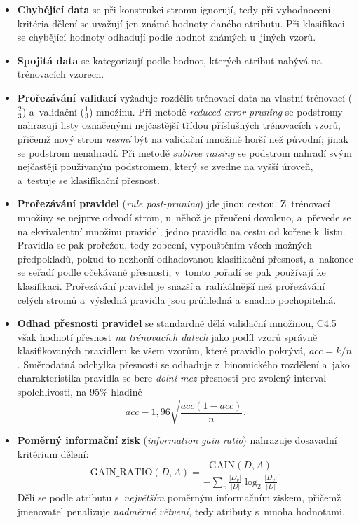 \documentclass[11pt,a4paper]{article}
\theoremstyle{definition}
\begin{document}
\begin{itemize}
\item \textbf{Chybějící data} se při konstrukci stromu ignorují, tedy při vyhodnocení kritéria
      dělení se uvažují jen známé hodnoty daného atributu. Při klasifikaci se chybějící
      hodnoty odhadují podle hodnot známých u~jiných vzorů.
\item \textbf{Spojitá data} se kategorizují podle hodnot, kterých atribut nabývá na
      trénovacích vzorech.
\item \textbf{Prořezávání validací} vyžaduje rozdělit trénovací data na vlastní trénovací
      ($\tfrac23$) a~validační ($\tfrac13$) množinu. Při metodě \emph{reduced-error pruning}
      se podstromy nahrazují listy označenými nejčastější třídou příslušných trénovacích
      vzorů, přičemž nový strom \emph{nesmí} být na validační množině horší než původní;
      jinak se podstrom nenahradí. Při metodě \emph{subtree raising} se podstrom nahradí svým
      nejčastěji používaným podstromem, který se zvedne na vyšší úroveň, a~testuje se
      klasifikační přesnost.
\item \textbf{Prořezávání pravidel} (\emph{rule post-pruning}) jde jinou cestou. Z~trénovací
      množiny se nejprve odvodí strom, u~něhož je přeučení dovoleno, a~převede se na
      ekvivalentní množinu pravidel, jedno pravidlo na cestu od kořene k~listu. Pravidla se
      pak prořežou, tedy zobecní, vypouštěním všech možných předpokladů, pokud to nezhorší
      odhadovanou klasifikační přesnost, a~nakonec se seřadí podle očekávané přesnosti;
      v~tomto pořadí se pak používají ke klasifikaci. Prořezávání pravidel je snazší
      a~radikálnější než prořezávání celých stromů a~výsledná pravidla jsou průhledná
      a~snadno pochopitelná.
\item \textbf{Odhad přesnosti pravidel} se standardně dělá validační množinou, C4.5 však
      hodnotí přesnost \emph{na trénovacích datech} jako podíl vzorů správně klasifikovaných
      pravidlem ke všem vzorům, které pravidlo pokrývá, $\mathit{acc}=k/n$. Směrodatná
      odchylka přesnosti se odhaduje z~binomického rozdělení a~jako charakteristika pravidla
      se bere \emph{dolní mez} přesnosti pro zvolený interval spolehlivosti, na 95\% hladině
      \[ \mathit{acc}-1{,}96\sqrt{\frac{\mathit{acc}(1-\mathit{acc})}{n}}. \]
\item \textbf{Poměrný informační zisk} (\emph{information gain ratio}) nahrazuje dosavadní
      kritérium dělení:
      \[ \mathrm{GAIN\_RATIO}(D,A)=\frac{\mathrm{GAIN}(D,A)}
         {-\sum_{v}\frac{|D_v|}{|D|}\log_2\frac{|D_v|}{|D|}}. \]
      Dělí se podle atributu s~\emph{největším} poměrným informačním ziskem, přičemž
      jmenovatel penalizuje \emph{nadměrné větvení}, tedy atributy s~mnoha hodnotami.
\end{itemize}
\end{document}

